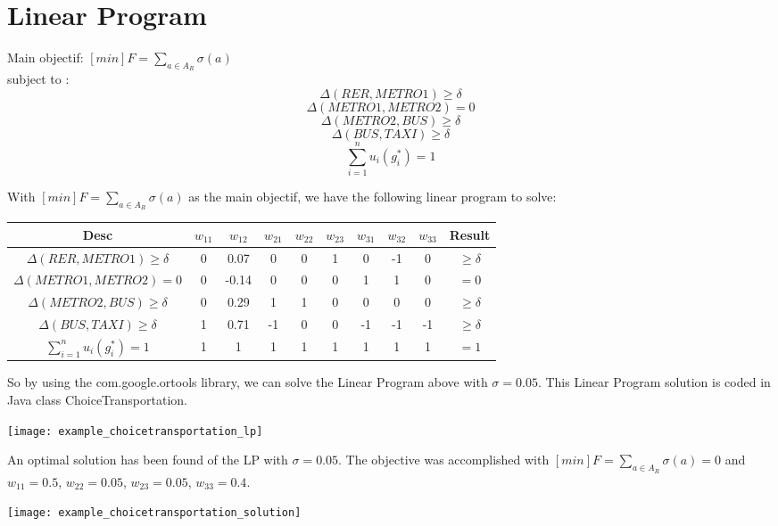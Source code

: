 \documentclass{article}
\begin{document}
\section{Linear Program}
Main objectif: $[min]F = \sum_{a \in A_R} \sigma(a) $ \\
subject to : 
$$\Delta (RER, METRO1)\geq \delta$$
$$\Delta (METRO1, METRO2) = 0$$
$$\Delta (METRO2, BUS)\geq \delta$$
$$\Delta (BUS, TAXI) \geq \delta$$
$$\sum_{i=1}^{n} u_i(g_{i}^{*}) = 1$$
	
With $[min]F = \sum_{a \in A_R} \sigma(a) $ as the main objectif, we have the following linear program to solve: 
 
\begin{center}
\begin{tabular}{ |c|c|c|c|c|c|c|c|c|c| } 
\hline Desc & $w_{11}$ & $w_{12}$ & $w_{21}$ & $w_{22}$  & $w_{23}$ & $w_{31}$ & $w_{32}$ & $w_{33}$ & Result  \\ \hline
$\Delta (RER, METRO1)\geq \delta$     & 0 & 0.07  & 0  & 0 & 1 & 0  & -1 & 0 & $\geq \delta$\\
$\Delta (METRO1, METRO2) = 0$         & 0 & -0.14 & 0  & 0 & 0 & 1  & 1  & 0 & $= 0$\\
$\Delta (METRO2, BUS)\geq \delta$     & 0 & 0.29  & 1  & 1 & 0 & 0  & 0   & 0 & $\geq \delta$\\
$\Delta (BUS, TAXI) \geq \delta$          & 1 & 0.71  & -1 & 0 & 0 & -1 & -1 & -1 & $\geq \delta$\\
$\sum_{i=1}^{n} u_i(g_{i}^{*}) = 1$ & 1 & 1       & 1   & 1 & 1 & 1  & 1  & 1 & $= 1$ \\
\hline
\end{tabular}
\end{center}

So by using the com.google.ortools library, we can solve the Linear Program above with $\sigma = 0.05$. This Linear Program solution is coded in Java class ChoiceTransportation.
\begin{center}
\texttt{[image: example\_choicetransportation\_lp]}
\end{center}

An optimal solution has been found of the LP with $\sigma = 0.05$. The objective was accomplished with $[min]F = \sum_{a \in A_R} \sigma(a) = 0$ and $w_{11} = 0.5$, $w_{22} = 0.05$, $w_{23} = 0.05$, $w_{33}=0.4$. 

\begin{center}
\texttt{[image: example\_choicetransportation\_solution]}
\end{center}
\end{document}

